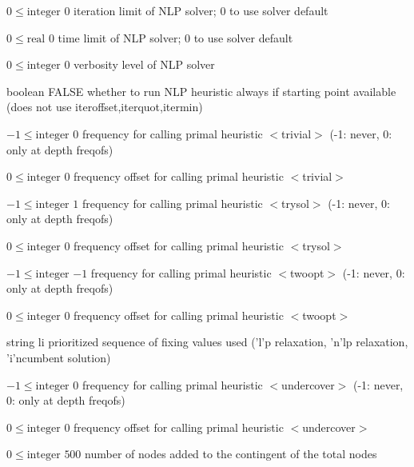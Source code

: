 %
{$0\leq\textrm{integer}$}%
{$0$}%
{iteration limit of NLP solver; 0 to use solver default}%
{}

%
{$0\leq\textrm{real}$}%
{$0$}%
{time limit of NLP solver; 0 to use solver default}%
{}

%
{$0\leq\textrm{integer}$}%
{$0$}%
{verbosity level of NLP solver}%
{}

%
{boolean}%
{FALSE}%
{whether to run NLP heuristic always if starting point available (does not use iteroffset,iterquot,itermin)}%
{}

%
{$-1\leq\textrm{integer}$}%
{$0$}%
{frequency for calling primal heuristic $<$trivial$>$ (-1: never, 0: only at depth freqofs)}%
{}

%
{$0\leq\textrm{integer}$}%
{$0$}%
{frequency offset for calling primal heuristic $<$trivial$>$}%
{}

%
{$-1\leq\textrm{integer}$}%
{$1$}%
{frequency for calling primal heuristic $<$trysol$>$ (-1: never, 0: only at depth freqofs)}%
{}

%
{$0\leq\textrm{integer}$}%
{$0$}%
{frequency offset for calling primal heuristic $<$trysol$>$}%
{}

%
{$-1\leq\textrm{integer}$}%
{$-1$}%
{frequency for calling primal heuristic $<$twoopt$>$ (-1: never, 0: only at depth freqofs)}%
{}

%
{$0\leq\textrm{integer}$}%
{$0$}%
{frequency offset for calling primal heuristic $<$twoopt$>$}%
{}

%
{string}%
{li}%
{prioritized sequence of fixing values used ('l'p relaxation, 'n'lp relaxation, 'i'ncumbent solution)}%
{}

%
{$-1\leq\textrm{integer}$}%
{$0$}%
{frequency for calling primal heuristic $<$undercover$>$ (-1: never, 0: only at depth freqofs)}%
{}

%
{$0\leq\textrm{integer}$}%
{$0$}%
{frequency offset for calling primal heuristic $<$undercover$>$}%
{}

%
{$0\leq\textrm{integer}$}%
{$500$}%
{number of nodes added to the contingent of the total nodes}%
{}

